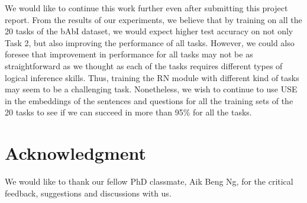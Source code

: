 \documentclass{article}
\begin{document}
We would like to continue this work further even after submitting this project report. From the results of our experiments, we believe that by training on all the 20 tasks of the bAbI dataset, we would expect higher test accuracy on not only Task 2, but also improving the performance of all tasks. However, we could also foresee that improvement in performance for all tasks may not be as straightforward as we thought as each of the tasks requires different types of logical inference skills. Thus, training the RN module with different kind of tasks may seem to be a challenging task. Nonetheless, we wish to continue to use USE in the embeddings of the sentences and questions for all the training sets of the 20 tasks to see if we can succeed in more than 95\% for all the tasks.

\section*{Acknowledgment}

We would like to thank our fellow PhD classmate, Aik Beng Ng, for the critical feedback, suggestions and discussions with us.






\end{document}

